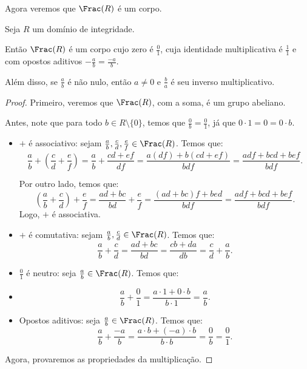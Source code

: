 Agora veremos que $\Frac(R)$ é um corpo.
\begin{theorem}
    Seja $R$ um domínio de integridade.
    
    Então $\Frac(R)$ é um corpo cujo zero é $\frac{0}{1}$, cuja identidade multiplicativa é $\frac{1}{1}$ e com opostos aditivos $-\frac{a}{b}=\frac{-a}{b}$.

    Além disso, se $\frac{a}{b}$ é não nulo, então $a\neq 0$ e $\frac{b}{a}$ é seu inverso multiplicativo.
\end{theorem}
\begin{proof}
    Primeiro, veremos que $\Frac(R)$, com a soma, é um grupo abeliano.

    Antes, note que para todo $b \in R\setminus\{0\}$, temos que $\frac{0}{b}=\frac{0}{1}$, já que $0\cdot 1=0=0\cdot b$.

    \begin{itemize}
        \item $+$ é associativo: sejam $\frac{a}{b}, \frac{c}{d}, \frac{e}{f} \in \Frac(R)$. Temos que:
        \[\frac{a}{b}+\left(\frac{c}{d}+\frac{e}{f}\right)=\frac{a}{b}+\frac{cd+ef}{df}=\frac{a(df)+b(cd+ef)}{bdf}=\frac{adf+bcd+bef}{bdf}.\]

        Por outro lado,  temos que:
        \[\left(\frac{a}{b}+\frac{c}{d}\right)+\frac{e}{f}=\frac{ad+bc}{bd}+\frac{e}{f}=\frac{(ad+bc)f+bed}{bdf}=\frac{adf+bcd+bef}{bdf}.\]
        Logo, $+$ é associativa.

        \item $+$ é comutativa: sejam $\frac{a}{b}, \frac{c}{d} \in \Frac(R)$. Temos que:
        \[\frac{a}{b}+\frac{c}{d}=\frac{ad+bc}{bd}=\frac{cb+da}{db}=\frac{c}{d}+\frac{a}{b}.\]

        \item $\frac{0}{1}$ é neutro: seja $\frac{a}{b} \in \Frac(R)$. Temos que:
        \item \[\frac{a}{b}+\frac{0}{1}=\frac{a\cdot 1+0\cdot b}{b\cdot 1}=\frac{a}{b}.\]
        
        \item Opostos aditivos: seja $\frac{a}{b} \in \Frac(R)$. Temos que:
        \[\frac{a}{b}+\frac{-a}{b}=\frac{a\cdot b+(-a)\cdot b}{b\cdot b}=\frac{0}{b}=\frac{0}{1}.\]
    \end{itemize}

    Agora, provaremos as propriedades da multiplicação.


\end{proof}
